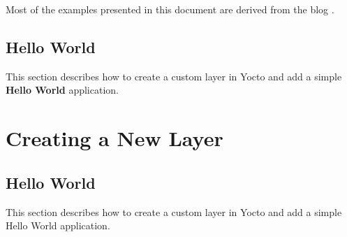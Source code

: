 \documentclass{article}
\begin{document}
Most of the examples presented in this document are derived from the blog \cite{1}.

\subsection{Hello World}
This section describes how to create a custom layer in Yocto and add a simple \textbf{Hello World} application.
\section{Creating a New Layer}
\subsection{Hello World}

This section describes how to create a custom layer in Yocto and add a simple Hello World application.
\end{document}
